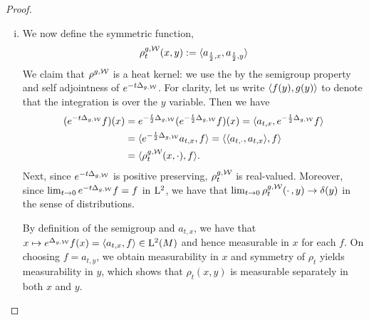 \documentclass[a4paper, 12pt]{amsart}
\begin{document}
\begin{proof}
\begin{enumerate}[(i)]
\item We now define the symmetric function,
  $$\rho^{g,\mathcal{W}}_t(x,y) := \langle a_{\frac{t}{2}, x}, a_{\frac{t}{2}, y} \rangle$$
        We claim that \(\rho^{g,\mathcal{W}}\) is a heat kernel: we use the by the semigroup property and self adjointness of \(e^{-t\Delta_{g,\mathcal{W}}}\). For clarity, let us write \(\langle f(y), g(y) \rangle\) to denote that the integration is over the \(y\) variable. Then we have
	\[
        \begin{split}
        (e^{-t \Delta_{g,\mathcal{W}}}f) (x) &= e^{-\frac{t}{2} \Delta_{g,\mathcal{W}}} (e^{-\frac{t}{2} \Delta_{g,\mathcal{W}}} f) (x) = \langle a_{t,x}, e^{-\frac{t}{2} \Delta_{g,\mathcal{W}}} f \rangle \\
        &= \langle e^{-\frac{t}{2} \Delta_{g,\mathcal{W}}} a_{t,x}, f \rangle = \langle \langle a_{t,\cdot}, a_{t,x} \rangle, f \rangle \\
        &= \langle \rho^{g,\mathcal{W}}_t(x,\cdot), f \rangle.
        \end{split}
        \]
        Next, since $e^{-t \Delta_{g,\mathcal{W}}}$	is positive preserving, $\rho_t^{g,\mathcal{W}}$ is real-valued. Moreover, since $\lim_{t\to 0} e^{-t\Delta_{g,\mathcal{W}}}f = f$ in ${\rm L}^{2}_{\rm {}}$, we have that $\lim_{t \to 0} \rho^{g,\mathcal{W}}_t(\cdotp,y) \to  \delta(y)$ in the sense of distributions.

        By definition of the semigroup and $a_{t,x}$, we have that $x\mapsto e^{\Delta_{g,\mathcal{W}}}f(x) = \langle a_{t,x},f \rangle \in {\rm L}^{2}_{\rm {}}(M)$
	and hence measurable in $x$ for each $f$. 
	On choosing \(f = a_{t,y}\), we obtain 
	measurability in \(x\) and symmetry of \(\rho_t\) yields measurability in \(y\),
	which shows that \(\rho_t(x, y)\) is measurable separately in both \(x\) and \(y\). 


\end{enumerate}
\end{proof}
\end{document}
